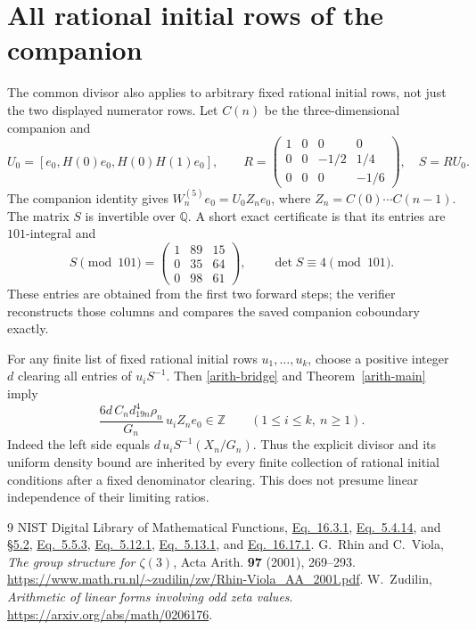 \documentclass[11pt]{article}
\newcommand{\Z}{\mathbb Z}
\newcommand{\Q}{\mathbb Q}
\begin{document}
\section{All rational initial rows of the companion}
The common divisor also applies to arbitrary fixed rational initial
rows, not just the two displayed numerator rows. Let $C(n)$ be the
three-dimensional companion and
\[
 U_0=[e_0,H(0)e_0,H(0)H(1)e_0],\qquad
 R=\begin{pmatrix}1&0&0&0\\0&0&-1/2&1/4\\0&0&0&-1/6\end{pmatrix},
 \quad S=RU_0.
\]
The companion identity gives $W_n^{(5)}e_0=U_0Z_ne_0$, where
$Z_n=C(0)\cdots C(n-1)$. The matrix $S$ is invertible over $\Q$.
A short exact certificate is that its entries are $101$-integral and
\[
 S\pmod {101}=\begin{pmatrix}1&89&15\\0&35&64\\0&98&61\end{pmatrix},
 \qquad \det S\equiv4\pmod {101}.
\]
These entries are obtained from the first two forward steps; the
verifier reconstructs those columns and compares the saved companion
coboundary exactly.

For any finite list of fixed rational initial rows $u_1,\ldots,u_k$,
choose a positive integer $d$ clearing all entries of $u_iS^{-1}$.
Then \eqref{arith-bridge} and Theorem~\ref{arith-main} imply
\[
 \boxed{\displaystyle
 \frac{6d\,C_nd_{19n}^4\rho_n}{G_n}\,u_iZ_ne_0\in\Z
 \qquad(1\leq i\leq k,\ n\geq1).}
\]
Indeed the left side equals $d\,u_iS^{-1}(X_n/G_n)$.
Thus the explicit divisor and its uniform density bound are inherited
by every finite collection of rational initial conditions after a
fixed denominator clearing. This does not presume linear independence
of their limiting ratios.


\begin{thebibliography}{9}
 NIST Digital Library of Mathematical Functions,
\href{https://dlmf.nist.gov/16.3.E1}{Eq.~16.3.1},
\href{https://dlmf.nist.gov/5.4.E14}{Eq.~5.4.14}, and
\href{https://dlmf.nist.gov/5.2}{\S5.2},
\href{https://dlmf.nist.gov/5.5.E3}{Eq.~5.5.3},
\href{https://dlmf.nist.gov/5.12.E1}{Eq.~5.12.1},
\href{https://dlmf.nist.gov/5.13.E1}{Eq.~5.13.1}, and
\href{https://dlmf.nist.gov/16.17.E1}{Eq.~16.17.1}.
 G.~Rhin and C.~Viola,
\emph{The group structure for $\zeta(3)$},
Acta Arith. \textbf{97} (2001), 269--293.
\url{https://www.math.ru.nl/~zudilin/zw/Rhin-Viola_AA_2001.pdf}.
 W.~Zudilin,
\emph{Arithmetic of linear forms involving odd zeta values}.
\url{https://arxiv.org/abs/math/0206176}.
\end{thebibliography}
\end{document}
